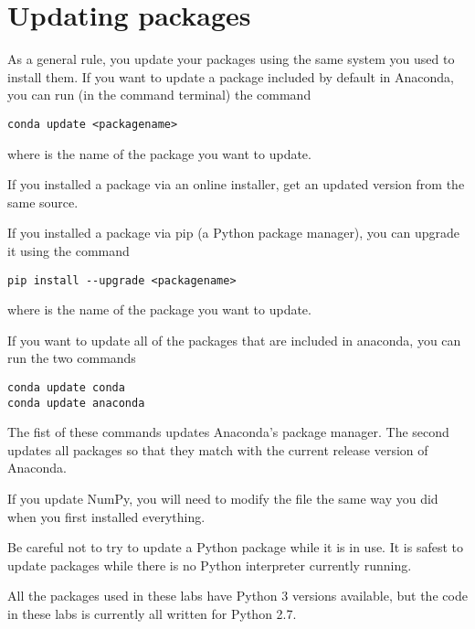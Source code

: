 \section*{Updating packages}
As a general rule, you update your packages using the same system you used to install them.
If you want to update a package included by default in Anaconda, you can run (in the command terminal) the command
\begin{lstlisting}[style=ShellInput]
conda update <packagename>
\end{lstlisting}
where  is the name of the package you want to update.

If you installed a package via an online installer, get an updated version from the same source.

If you installed a package via pip (a Python package manager), you can upgrade it using the command
\begin{lstlisting}[style=ShellInput]
pip install --upgrade <packagename>
\end{lstlisting}
where  is the name of the package you want to update.

If you want to update all of the packages that are included in anaconda, you can run the two commands
\begin{lstlisting}[style=ShellInput]
conda update conda
conda update anaconda
\end{lstlisting}
The fist of these commands updates Anaconda's package manager.
The second updates all packages so that they match with the current release version of Anaconda.

\begin{info}
If you update NumPy, you will need to modify the file  the same way you did when you first installed everything.
\end{info}

\begin{warn}
Be careful not to try to update a Python package while it is in use.
It is safest to update packages while there is no Python interpreter currently running.
\end{warn}

\begin{info}
All the packages used in these labs have Python 3 versions available, but the code in these labs is currently all written for Python 2.7.
\end{info}
